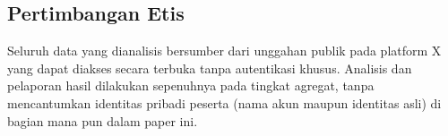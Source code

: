 \subsection{Pertimbangan Etis}
Seluruh data yang dianalisis bersumber dari unggahan publik pada platform X yang dapat diakses secara terbuka tanpa autentikasi khusus. Analisis dan pelaporan hasil dilakukan sepenuhnya pada tingkat agregat, tanpa mencantumkan identitas pribadi peserta (nama akun maupun identitas asli) di bagian mana pun dalam paper ini.